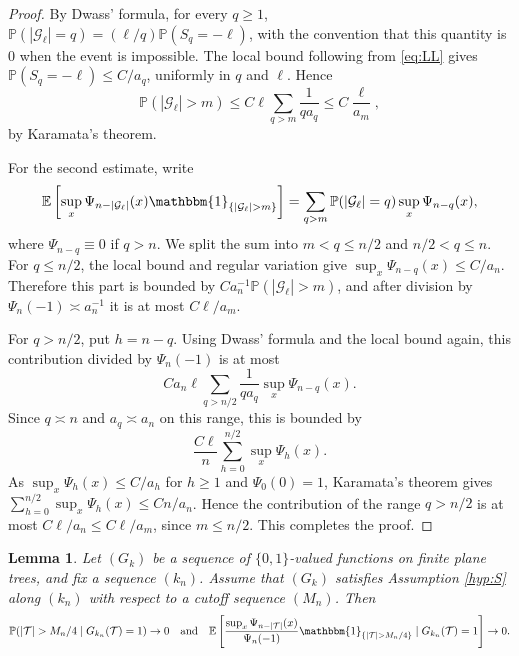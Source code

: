 \documentclass[a4paper,11pt]{article}
\newtheorem{lemma}[theorem]{Lemma}
\newcommand{\E}{\mathbb{E}}
\DeclareRobustCommand{\P}{\mathbb{P}}
\DeclareRobustCommand{\1}{\mathbf{1}}
\begin{document}
\begin{proof}
By Dwass' formula, for every $q\ge1$,
$\P(|\mathcal G_\ell|=q)=(\ell/q)\P(S_q=-\ell)$, with the convention that
this quantity is $0$ when the event is impossible. The local bound following
from \eqref{eq:LL} gives $\P(S_q=-\ell)\le C/a_q$, uniformly in $q$ and
$\ell$. Hence
$$
\P(|\mathcal G_\ell|>m)
\le
C\ell\sum_{q>m}\frac{1}{q a_q}
\le
C\frac{\ell}{a_m},
$$
by Karamata's theorem.

For the second estimate, write
$$
\E\left[
\sup_x\Psi_{n-|\mathcal G_\ell|}(x)
\mathbbm{1}_{\{|\mathcal G_\ell|>m\}}
\right]
=
\sum_{q>m}\P(|\mathcal G_\ell|=q)\sup_x\Psi_{n-q}(x),
$$
where $\Psi_{n-q}\equiv0$ if $q>n$. We split the sum into $m<q\le n/2$ and
$n/2<q\le n$. For $q\le n/2$, the local bound and regular variation give
$\sup_x\Psi_{n-q}(x)\le C/a_n$. Therefore this part is bounded by
$C a_n^{-1}\P(|\mathcal G_\ell|>m)$, and after division by
$\Psi_n(-1)\asymp a_n^{-1}$ it is at most $C\ell/a_m$.

For $q>n/2$, put $h=n-q$. Using Dwass' formula and the local bound again,
this contribution divided by $\Psi_n(-1)$ is at most
$$
C a_n\ell
\sum_{q>n/2}\frac{1}{q a_q}\sup_x\Psi_{n-q}(x).
$$
Since $q\asymp n$ and $a_q\asymp a_n$ on this range, this is bounded by
$$
\frac{C\ell}{n}\sum_{h=0}^{n/2}\sup_x\Psi_h(x).
$$
As $\sup_x\Psi_h(x)\le C/a_h$ for $h\ge1$ and $\Psi_0(0)=1$, Karamata's
theorem gives $\sum_{h=0}^{n/2}\sup_x\Psi_h(x)\le Cn/a_n$. Hence the
contribution of the range $q>n/2$ is at most $C\ell/a_n\le C\ell/a_m$, since
$m\le n/2$. This completes the proof.
\end{proof}

\begin{lemma}
\label{lem:consequenceM}
Let $(G_k)$ be a sequence of $\{0,1\}$-valued functions on finite plane trees,
and fix a sequence $(k_n)$. Assume that $(G_k)$ satisfies Assumption
\ref{hyp:S} along $(k_n)$ with respect to a cutoff sequence $(M_{n})$.   Then
\begin{equation}
\label{eq:record} \P(|\mathcal T|>M_n/4 \mid G_{k_n}(\mathcal T)=1)\to0 \quad \textrm{and} \quad 
 \E\left[
\frac{\sup_x\Psi_{n-|\mathcal T|}(x)}{\Psi_n(-1)}
\mathbbm{1}_{\{|\mathcal T|>M_n/4\}} \mid G_{k_n}(\mathcal T)=1
\right]\to0.
\end{equation}
\end{lemma}
\end{document}
